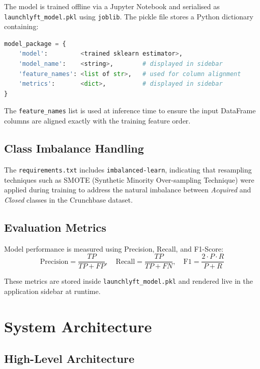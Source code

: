 \documentclass[12pt,a4paper]{article}
\begin{document}
The model is trained offline via a Jupyter Notebook and serialised as
\texttt{launchlyft\_model.pkl} using \texttt{joblib}. The pickle file stores a
Python dictionary containing:

\begin{lstlisting}[language=Python, caption={Model package structure (from app.py inference code)}]
model_package = {
    'model':         <trained sklearn estimator>,
    'model_name':    <string>,        # displayed in sidebar
    'feature_names': <list of str>,   # used for column alignment
    'metrics':       <dict>,          # displayed in sidebar
}
\end{lstlisting}

The \texttt{feature\_names} list is used at inference time to ensure the input
DataFrame columns are aligned exactly with the training feature order.

\subsection{Class Imbalance Handling}

The \texttt{requirements.txt} includes \texttt{imbalanced-learn}, indicating that
resampling techniques such as SMOTE (Synthetic Minority Over-sampling Technique)
were applied during training to address the natural imbalance between
\textit{Acquired} and \textit{Closed} classes in the Crunchbase dataset.

\subsection{Evaluation Metrics}

Model performance is measured using Precision, Recall, and F1-Score:
\[
    \text{Precision} = \frac{TP}{TP + FP}, \quad
    \text{Recall}    = \frac{TP}{TP + FN}, \quad
    \text{F1}        = \frac{2 \cdot P \cdot R}{P + R}
\]

These metrics are stored inside \texttt{launchlyft\_model.pkl} and rendered
live in the application sidebar at runtime.

\section{System Architecture}

\subsection{High-Level Architecture}
\end{document}
